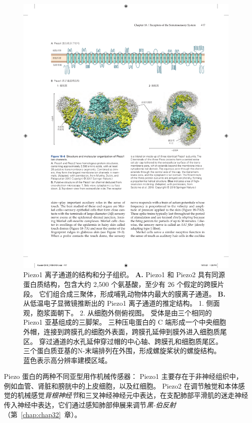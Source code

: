 \begin{figure}[htbp]
	\centering
	\includegraphics[width=1.0\linewidth]{chap18/fig_18_6}
	\caption{Piezo1 离子通道的结构和分子组织。
		\textbf{A.} Piezo1 和 Piezo2 具有同源蛋白质结构，包含大约 2,500 个氨基酸，至少有 26 个假定的跨膜片段。
		它们组合成三聚体，形成哺乳动物体内最大的膜离子通道\cite{murthy2017piezos}。
		\textbf{B.} 从低温电子显微镜推断出的 Piezo1 离子通道的推定结构。
		1. 侧面观，胞浆面朝下。
		2. 从细胞外侧俯视图。
		受体是由三个相同的 Piezo1 亚基组成的三脚架。
		三种压电蛋白的 C 端形成一个中央细胞外帽，连接到跨膜孔的细胞外表面，跨膜孔延伸到膜外进入细胞质尾区。
		穿过通道的水孔延伸穿过帽的中心轴、跨膜孔和细胞质尾区。
		三个蛋白质亚基的N-末端排列在外围，形成螺旋桨状的螺旋结构。 
		蓝色表示高分辨率建模区域\cite{saotome2018structure}。}
	\label{fig:18_6}
\end{figure}



Piezo 蛋白的两种不同亚型用作机械传感器：
Piezo1 主要存在于非神经组织中，例如血管、肾脏和膀胱中的上皮细胞，以及红细胞。
Piezo2 在调节触觉和本体感觉的机械感觉\textit{背根神经节}和三叉神经神经元中表达，在支配肺部平滑肌的迷走神经传入神经中表达，它们通过感知肺部伸展来调节\textit{黑-伯反射}（第~\ref{chap:chap32}~章）。



